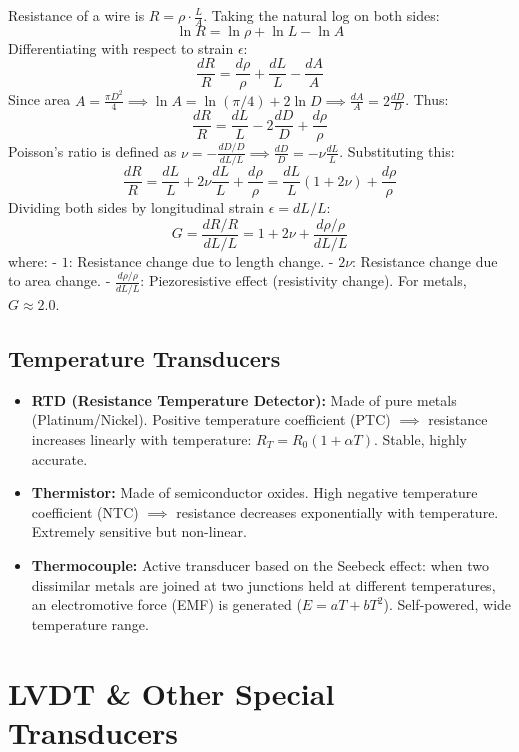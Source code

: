 \documentclass[12pt,a4paper]{article}
\begin{document}
\begin{tcolorbox}[formulabox, title={\textbf{Gauge Factor (G) Derivation}}]
Resistance of a wire is $R = \rho \cdot \frac{L}{A}$. Taking the natural log on both sides:
$$\ln R = \ln \rho + \ln L - \ln A$$
Differentiating with respect to strain $\epsilon$:
$$\frac{dR}{R} = \frac{d\rho}{\rho} + \frac{dL}{L} - \frac{dA}{A}$$
Since area $A = \frac{\pi D^2}{4} \implies \ln A = \ln(\pi/4) + 2\ln D \implies \frac{dA}{A} = 2\frac{dD}{D}$. Thus:
$$\frac{dR}{R} = \frac{dL}{L} - 2\frac{dD}{D} + \frac{d\rho}{\rho}$$
Poisson's ratio is defined as $\nu = -\frac{dD/D}{dL/L} \implies \frac{dD}{D} = -\nu \frac{dL}{L}$. Substituting this:
$$\frac{dR}{R} = \frac{dL}{L} + 2\nu\frac{dL}{L} + \frac{d\rho}{\rho} = \frac{dL}{L}(1 + 2\nu) + \frac{d\rho}{\rho}$$
Dividing both sides by longitudinal strain $\epsilon = dL/L$:
$$G = \frac{dR/R}{dL/L} = 1 + 2\nu + \frac{d\rho/\rho}{dL/L}$$
where:
- $1$: Resistance change due to length change.
- $2\nu$: Resistance change due to area change.
- $\frac{d\rho/\rho}{dL/L}$: Piezoresistive effect (resistivity change). For metals, $G \approx 2.0$.
\end{tcolorbox}

\subsection{Temperature Transducers}
\begin{itemize}[leftmargin=*, itemsep=3.5pt]
  \item \textbf{RTD (Resistance Temperature Detector):} Made of pure metals (Platinum/Nickel). Positive temperature coefficient (PTC) $\implies$ resistance increases linearly with temperature: $R_T = R_0(1 + \alpha T)$. Stable, highly accurate.
  \item \textbf{Thermistor:} Made of semiconductor oxides. High negative temperature coefficient (NTC) $\implies$ resistance decreases exponentially with temperature. Extremely sensitive but non-linear.
  \item \textbf{Thermocouple:} Active transducer based on the Seebeck effect: when two dissimilar metals are joined at two junctions held at different temperatures, an electromotive force (EMF) is generated ($E = aT + bT^2$). Self-powered, wide temperature range.
\end{itemize}

\section{LVDT \& Other Special Transducers}
\end{document}
